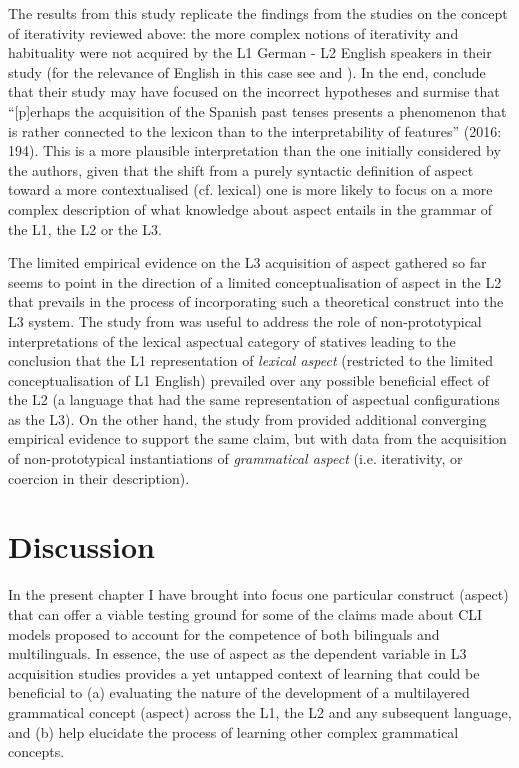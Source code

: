 \documentclass[output=paper,modfonts,nonflat,newtxmath]{langsci/langscibook}
\begin{document}
The results from this study replicate the findings from the studies on the concept of iterativity reviewed above: the more complex notions of iterativity and habituality were not acquired by the L1 German - L2 English speakers in their study (for the relevance of English in this case see \citealt{AthanasopoulosBylund2013} and \citealt{AthanasopoulosEtAl2015}). In the end, \citeauthor{DiaubalickGuijarro-Fuentes2016} conclude that their study may have focused on the incorrect hypotheses and surmise that “[p]erhaps the acquisition of the Spanish past tenses presents a phenomenon that is rather connected to the lexicon than to the interpretability of features” (2016: 194). This is a more plausible interpretation than the one initially considered by the authors, given that the shift from a purely syntactic definition of aspect toward a more contextualised (cf. lexical) one is more likely to focus on a more complex description of what knowledge about aspect entails in the grammar of the L1, the L2 or the L3.

The limited empirical evidence on the L3 acquisition of aspect gathered so far seems to point in the direction of a limited conceptualisation of aspect in the L2 that prevails in the process of incorporating such a theoretical construct into the L3 system. The study from \citet{Salaberry2005} was useful to address the role of non-prototypical interpretations of the lexical aspectual category of statives leading to the conclusion that the L1 representation of \textit{lexical aspect} (restricted to the limited conceptualisation of L1 English) prevailed over any possible beneficial effect of the L2 (a language that had the same representation of aspectual configurations as the L3). On the other hand, the study from \citet{DiaubalickGuijarro-Fuentes2016} provided additional converging empirical evidence to support the same claim, but with data from the acquisition of non-prototypical instantiations of \textit{grammatical aspect} (i.e. iterativity, or coercion in their description).

\section{Discussion}%
\label{sec:salaberry:4}

In the present chapter I have brought into focus one particular construct (aspect) that can offer a viable testing ground for some of the claims made about CLI models proposed to account for the competence of both bilinguals and multilinguals. In essence, the use of aspect as the dependent variable in L3 acquisition studies provides a yet untapped context of learning that could be beneficial to (a) evaluating the nature of the development of a multilayered grammatical concept (aspect) across the L1, the L2 and any subsequent language, and (b) help elucidate the process of learning other complex grammatical concepts.
\end{document}
